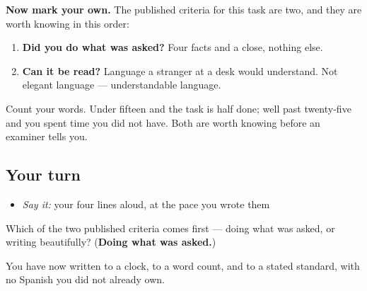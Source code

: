 \textbf{Now mark your own.} The published criteria for this task are two, and they are worth knowing in this order:

\begin{enumerate}
\raggedright
  \item \textbf{Did you do what was asked?} Four facts and a close, nothing else.
  \item \textbf{Can it be read?} Language a stranger at a desk would understand. Not elegant language — understandable language.
\end{enumerate}

Count your words. Under fifteen and the task is half done; well past twenty-five and you spent time you did not have. Both are worth knowing before an examiner tells you.

\subsection*{Your turn}
\begin{itemize}
\raggedright
  \item \emph{Say it:} your four lines aloud, at the pace you wrote them
\end{itemize}

\begin{tcolorbox}[breakable,colback=teal!4,colframe=teal!35!black,title={Before you move on}]
Which of the two published criteria comes first — doing what was asked, or writing beautifully? (\textbf{Doing what was asked.})

You have now written to a clock, to a word count, and to a stated standard, with no Spanish you did not already own.
\end{tcolorbox}
